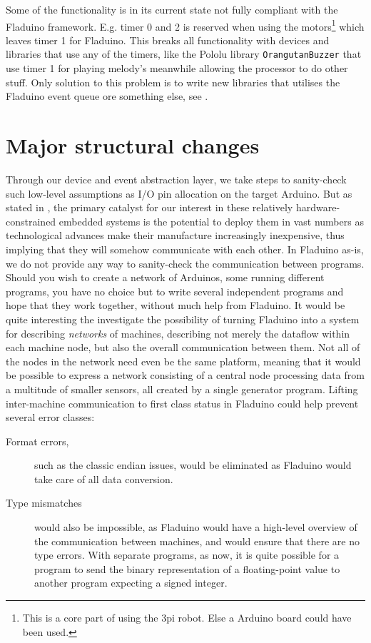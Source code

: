 \documentclass[a4paper, oneside, final]{memoir}
\let\fref\undefined
\let\Fref\undefined
\begin{document}
Some of the functionality is in its current state not fully compliant with the
Fladuino framework. E.g. timer 0 and 2 is reserved when using the
motors\footnote{This is a core part of using the 3pi robot. Else a Arduino board
  could have been used.} which leaves timer 1 for Fladuino. This breaks all
functionality with devices and libraries that use any of the timers, like the
Pololu library \texttt{OrangutanBuzzer} that use timer 1 for playing melody's
meanwhile allowing the processor to do other stuff. Only solution to this
problem is to write new libraries that utilises the Fladuino event queue ore
something else, see \fref{sec:fladuino-event-queue}.

\section{Major structural changes}

Through our device and event abstraction layer, we take steps to
sanity-check such low-level assumptions as I/O pin allocation on the
target Arduino.  But as stated in \Fref{sec:motivation}, the primary
catalyst for our interest in these relatively hardware-constrained
embedded systems is the potential to deploy them in vast numbers as
technological advances make their manufacture increasingly
inexpensive, thus implying that they will somehow communicate with
each other.  In Fladuino as-is, we do not provide any way to
sanity-check the communication between programs.  Should you wish to
create a network of Arduinos, some running different programs, you
have no choice but to write several independent programs and hope that
they work together, without much help from Fladuino.  It would be
quite interesting the investigate the possibility of turning Fladuino
into a system for describing \textit{networks} of machines, describing
not merely the dataflow within each machine node, but also the overall
communication between them.  Not all of the nodes in the network need
even be the same platform, meaning that it would be possible to
express a network consisting of a central node processing data from a
multitude of smaller sensors, all created by a single generator
program.  Lifting inter-machine communication to first class status in
Fladuino could help prevent several error classes:

\begin{description}
\item[Format errors,] such as the classic endian issues, would be
  eliminated as Fladuino would take care of all data conversion.
\item[Type mismatches] would also be impossible, as Fladuino would
  have a high-level overview of the communication between machines,
  and would ensure that there are no type errors.  With separate
  programs, as now, it is quite possible for a program to send the
  binary representation of a floating-point value to another program
  expecting a signed integer.
\end{description}
\end{document}
